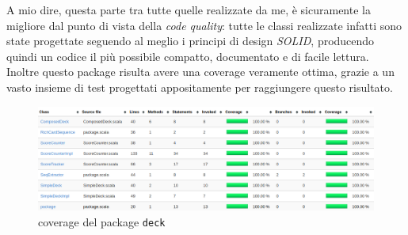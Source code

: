 \begin{itemize}
	A mio dire, questa parte tra tutte quelle realizzate da me, è sicuramente la migliore dal punto di vista della \textit{code quality}: tutte le classi realizzate infatti sono state progettate seguendo al meglio i principi di design \textit{SOLID}, producendo quindi un codice il più possibile compatto, documentato e di facile lettura.\\
	Inoltre questo package risulta avere una coverage veramente ottima, grazie a un vasto insieme di test progettati appositamente per raggiungere questo risultato.

	\begin{figure}[H]
		\includegraphics[width=\textwidth,height=\textheight,keepaspectratio]{deckCoverage}
		\caption{coverage del package \texttt{deck}}
	\end{figure}


\end{itemize}

